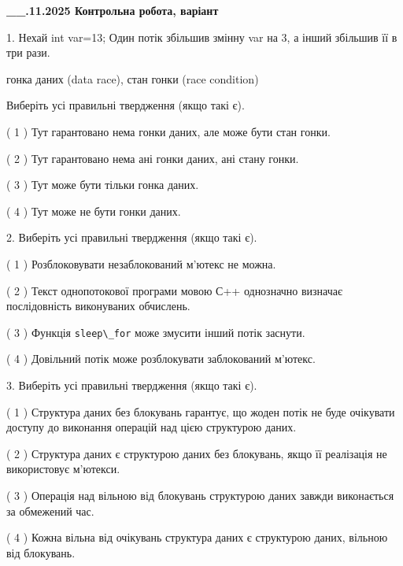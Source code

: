 \documentclass[12pt, ukrainian]{article}
\def\code#1{\Verb!#1!}
\begin{document}
\newpage
\begin {large}

\textbf{\_\_.11.2025 Контрольна робота, варіант  }\par


{
1. Нехай int var=13; Один потік збільшив змінну var на 3, а інший збільшив її в три рази.

гонка даних (data race), стан гонки (race condition)

Виберіть усі правильні твердження (якщо такі є).\par
\vspace{2mm}
( 1 ) Тут гарантовано нема гонки даних, але може бути стан гонки.%

( 2 ) Тут гарантовано нема ані гонки даних, ані стану гонки.%

( 3 ) Тут може бути тільки гонка даних.%

( 4 ) Тут може не бути гонки даних.%


2. Виберіть усі правильні твердження (якщо такі є).\par
\vspace{2mm}

( 1 ) Розблоковувати незаблокований м’ютекс не можна.%

( 2 ) Текст однопотокової програми мовою С++ однозначно визначає послідовність виконуваних обчислень.%

( 3 ) Функція \code{sleep\_for} може змусити інший потік заснути.%

( 4 ) Довільний потік може розблокувати заблокований м’ютекс.%


3. Виберіть усі правильні твердження (якщо такі є).\par
\vspace{2mm}

( 1 ) Структура даних без блокувань гарантує, що жоден потік не буде очікувати доступу до виконання операцій над цією структурою даних.%

( 2 ) Структура даних є структурою даних без блокувань, якщо її реалізація не використовує м’ютекси.%

( 3 ) Операція над вільною від блокувань структурою даних завжди виконається за обмежений час.%

( 4 ) Кожна вільна від очікувань структура даних є структурою даних, вільною від блокувань.%


}
\end{large}
\end{document}
